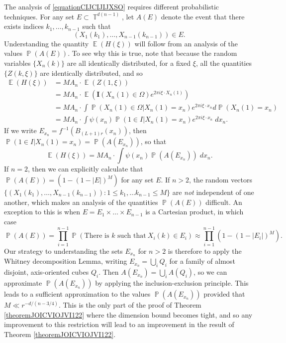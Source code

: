 \documentclass[dvipsnames,letterpaper,12pt]{article}
\numberwithin{equation}{section}
\DeclareMathOperator{\TT}{\mathbb{T}}
\numberwithin{theorem}{section}
\DeclareMathOperator{\EE}{\mathbb{E}}
\DeclareMathOperator{\PP}{\mathbb{P}}
\begin{document}
The analysis of \eqref{equationCIJCIJIJXSO} requires different probabilistic techniques. For any set $E \subset \TT^{d(n-1)}$, let $A(E)$ denote the event that there exists indices $k_1,\dots, k_{n-1}$ such that
%
\[ (X_1(k_1), \dots, X_{n-1}(k_{n-1})) \in E. \]
%
Understanding the quantity $\EE(H(\xi))$ will follow from an analysis of the values $\PP(A(E))$. To see why this is true, note that because the random variables $\{ X_n(k) \}$ are all identically distributed, for a fixed $\xi$, all the quantities $\{ Z(k,\xi) \}$ are identically distributed, and so
%
\begin{align*}
    \EE(H(\xi)) &= M A_n \cdot \EE(Z(1,\xi))\\
    &= M A_n \cdot \EE( \mathbf{I}(X_n(1) \in \Omega) e^{2 \pi i \xi \cdot X_n(1)} )\\
    &= M A_n \cdot \int \PP(X_n(1) \in \Omega | X_n(1) = x_n) e^{2 \pi i \xi \cdot x_n} d\PP(X_n(1) = x_n)\\
    &= M A_n \cdot \int \psi(x_n) \PP(1 \in I | X_n(1) = x_n) e^{2 \pi i \xi \cdot x_n}\; dx_n.
\end{align*}
%
If we write $E_{x_n} = f^{-1}(B_{(L+1)r}(x_n))$, then $\PP(1 \in I | X_n(1) = x_n) = \PP(A(E_{x_n}))$, so that
%
\[ \EE(H(\xi)) = MA_n \cdot \int \psi(x_n) \PP(A(E_{x_n}))\; dx_n. \]
%
If $n = 2$, then we can explicitly calculate that $\PP(A(E)) = (1 - (1 - |E|)^M)$ for any set $E$. If $n > 2$, the random vectors $\{ (X_1(k_1), \dots, X_{n-1}(k_{n-1})) : 1 \leq k_1, \dots k_{n-1} \leq M \}$ are \emph{not} independent of one another, which makes an analysis of the quantities $\PP(A(E))$ difficult. An exception to this is when $E = E_1 \times \dots \times E_{n-1}$ is a Cartesian product, in which case
%
\[ \PP(A(E)) = \prod_{i = 1}^{n-1} \PP(\text{There is $k$ such that}\ X_i(k) \in E_i) \approx \prod_{i = 1}^{n-1} (1 - (1 - |E_i|)^M). \]
%
Our strategy to understanding the sets $E_{x_n}$ for $n > 2$ is therefore to apply the Whitney decomposition Lemma, writing $E_{x_n} = \bigcup_i Q_i$ for a family of almost disjoint, axis-oriented cubes $Q_i$. Then $A(E_{x_n}) = \bigcup_i A(Q_i)$, so we can approximate $\PP(A(E_{x_n}))$ by applying the inclusion-exclusion principle. This leads to a sufficient approximation to the values $\PP(A(E_{x_n}))$ provided that $M \ll r^{-d/(n-3/4)}$. This is the only part of the proof of Theorem \ref{theoremJOICVIOJVI122} where the dimension bound becomes tight, and so any improvement to this restriction will lead to an improvement in the result of Theorem \ref{theoremJOICVIOJVI122}.
\end{document}
